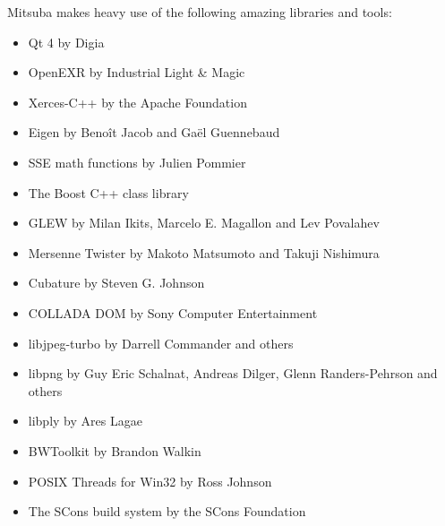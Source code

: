 Mitsuba makes heavy use of the following amazing libraries and tools: 
\begin{itemize}
\item Qt 4 by Digia
\item OpenEXR by Industrial Light \& Magic
\item Xerces-C+\!+ by the Apache Foundation
\item Eigen by Beno\^it Jacob and Ga\"el Guennebaud
\item SSE math functions by Julien Pommier
\item The Boost C+\!+ class library
\item GLEW by Milan Ikits, Marcelo E. Magallon and Lev Povalahev
\item Mersenne Twister by Makoto Matsumoto and Takuji Nishimura
\item Cubature by Steven G. Johnson
\item COLLADA DOM by Sony Computer Entertainment
\item libjpeg-turbo by Darrell Commander and others
\item libpng by Guy Eric Schalnat, Andreas Dilger, Glenn Randers-Pehrson and \mbox{others}
\item libply by Ares Lagae
\item BWToolkit by Brandon Walkin
\item POSIX Threads for Win32 by Ross Johnson
\item The SCons build system by the SCons Foundation
\end{itemize}
